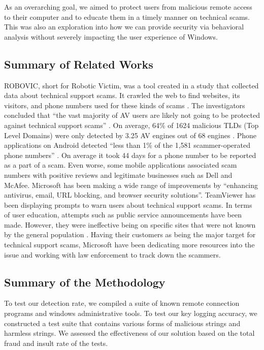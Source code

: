 \documentclass[final]{IEEEtran}
\begin{document}
As an overarching goal, we aimed to protect users from malicious remote access to their computer and to educate them in a timely manner on technical scams. This was also an exploration into how we can provide security via behavioral analysis without severely impacting the user experience of Windows.

\subsection{Summary of Related Works}

ROBOVIC, short for Robotic Victim, was a tool created in a study that collected data about technical support scams. It crawled the web to find websites, its visitors, and phone numbers used for these kinds of scams \cite[Fig 2]{b2}. The investigators concluded that “the vast majority of AV users are likely not going to be protected against technical support scams”  \cite[p.7]{b2}. On average, 64\% of 1624 malicious TLDs (Top Level Domains) were only detected by 3.25 AV engines out of 68 engines \cite[p.7]{b2}. Phone applications on Android detected “less than 1\% of the 1,581 scammer-operated phone numbers” \cite[p.8]{b2}. On average it took 44 days for a phone number to be reported as a part of a scam. Even worse, some mobile applications associated scam numbers with positive reviews and legitimate businesses such as Dell and McAfee. Microsoft has been making a wide range of improvements by “enhancing antivirus, email, URL blocking, and browser security solutions”. TeamViewer has been displaying prompts to warn users about technical support scams. In terms of user education, attempts such as public service announcements have been made. However, they were ineffective being on specific sites that were not known by the general population  \cite[p.13]{b2}. Having their customers as being the major target for technical support scams, Microsoft have been dedicating more resources into the issue and working with law enforcement to track down the scammers.



\subsection{Summary of the Methodology}
To test our detection rate, we compiled a suite of known remote connection programs and windows administrative tools.
To test our key logging accuracy, we constructed a test suite that contains various forms of malicious strings and harmless strings.
We assessed the effectiveness of our solution based on the total fraud and insult rate of the tests.
\end{document}
